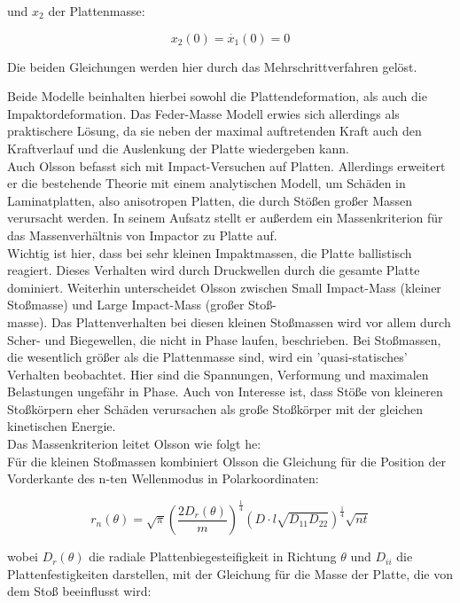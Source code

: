 und $x_{2}$ der Plattenmasse:

\begin{equation}
	x_{2}(0)=\dot{x_{1}}(0)=0
\end{equation}

Die beiden Gleichungen werden hier durch das Mehrschrittverfahren gelöst. 

Beide Modelle beinhalten hierbei sowohl die Plattendeformation, als auch die Impaktordeformation. Das Feder-Masse Modell erwies sich allerdings als praktischere Lösung, da sie neben der maximal auftretenden Kraft auch den Kraftverlauf und die Auslenkung der Platte wiedergeben kann. \\
Auch Olsson \cite{Olsson.2000} befasst sich mit Impact-Versuchen auf Platten. Allerdings erweitert er die bestehende Theorie mit einem analytischen Modell, um Schäden in Laminatplatten, also anisotropen Platten, die durch Stößen großer Massen verursacht werden. In seinem Aufsatz stellt er außerdem ein Massenkriterion für das Massenverhältnis von Impactor zu Platte auf.\\
Wichtig ist hier, dass bei sehr kleinen Impaktmassen, die Platte ballistisch reagiert. Dieses Verhalten wird durch Druckwellen durch die gesamte Platte dominiert. Weiterhin unterscheidet Olsson zwischen Small Impact-Mass (kleiner Stoßmasse) und Large Impact-Mass (großer Stoß-\\masse). Das Plattenverhalten bei diesen kleinen Stoßmassen wird vor allem durch Scher- und Biegewellen, die nicht in Phase laufen, beschrieben. Bei Stoßmassen, die wesentlich größer als die Plattenmasse sind, wird ein 'quasi-statisches' Verhalten beobachtet. Hier sind die Spannungen, Verformung und maximalen Belastungen ungefähr in Phase. Auch von Interesse ist, dass Stöße von kleineren Stoßkörpern eher Schäden verursachen als große Stoßkörper mit der gleichen kinetischen Energie.\\
Das Massenkriterion leitet Olsson wie folgt he:\\
Für die kleinen Stoßmassen kombiniert Olsson die Gleichung für die Position der Vorderkante des n-ten Wellenmodus in Polarkoordinaten:

\begin{equation}
	r_{n}(\theta) = \sqrt{\pi}(\frac{2D_{r}(\theta)}{m})^{\frac{1}{4}} (D \cdot l\sqrt{D_{11}D_{22}})^{\frac{1}{4}}\sqrt{nt}
\end{equation}

wobei $D_{r}(\theta)$ die radiale Plattenbiegesteifigkeit in Richtung $\theta$ und $D_{ii}$ die Plattenfestigkeiten darstellen, mit der Gleichung für die Masse der Platte, die von dem Stoß beeinflusst wird:

